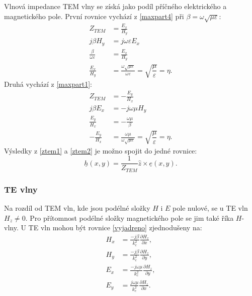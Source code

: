 \documentclass[12pt,a4paper,oneside]{article}
\numberwithin{equation}{section} %
\numberwithin{figure}{section} %
\numberwithin{table}{section} %
\newcommand{\faz}[1]{{\underline{#1}}} %
\begin{document}
Vlnová impedance TEM vlny se získá jako podíl příčného elektrického a magnetického pole. První rovnice vychází z \ref{maxpart4} při $\beta = \omega \sqrt{\mu \varepsilon}$:
\begin{subequations}
\label{ztem1}
\begin{align}
Z_{TEM} &= \frac{E_x}{H_y}
\\
j \beta H_y &= j \omega \varepsilon E_x
\\
\frac{\beta}{\omega \varepsilon} &= \frac{E_x}{H_y}
\\
\frac{E_x}{H_y} &= \frac{\omega \sqrt{\mu \varepsilon}}{\omega \varepsilon} = \sqrt{\dfrac{\mu}{\varepsilon}} = \eta .
\end{align}
\end{subequations}
Druhá vychází z \ref{maxpart1}:
\begin{subequations}
\label{ztem2}
\begin{align}
Z_{TEM} &= - \frac{E_y}{H_x}
\\
j \beta E_x &= - j \omega \mu H_y
\\
\frac{E_y}{H_x} &= - \frac{\omega \mu}{\beta}
\\
- \frac{E_y}{H_x} &= \frac{\omega \mu}{\omega \sqrt{\mu \varepsilon}} = \sqrt{\dfrac{\mu}{\varepsilon}} = \eta .
\end{align}
\end{subequations}
Výsledky z \ref{ztem1} a \ref{ztem2} je možno spojit do jedné rovnice:
\begin{equation}
\faz{h} (x, y) = \frac{1}{Z_{TEM}} \hat{z} \times \faz{e} (x, y) .
\end{equation}


\subsubsection{TE vlny}
Na rozdíl od TEM vln, kde jsou podélné složky $H$ i $E$ pole nulové, se u TE vln $H_z  \neq 0$. Pro přítomnost podélné složky magnetického pole se jim také říka $H$-vlny. U TE vln mohou být rovnice \ref{vyjadreno} zjednodušeny na:
\begin{subequations}
\begin{align}
H_x &= \frac{-j \beta}{k^2_c} \frac{\partial H_z}{\partial x} ,
\\
H_y &= \frac{-j \beta}{k^2_c} \frac{\partial H_z}{\partial y} ,
\\
E_x &= \frac{-j \omega \mu}{k^2_c} \frac{\partial H_z}{\partial y} ,
\\
E_y &= \frac{j \omega \mu}{k^2_c} \frac{\partial H_z}{\partial x} .
\end{align}
\end{subequations}
\end{document}
